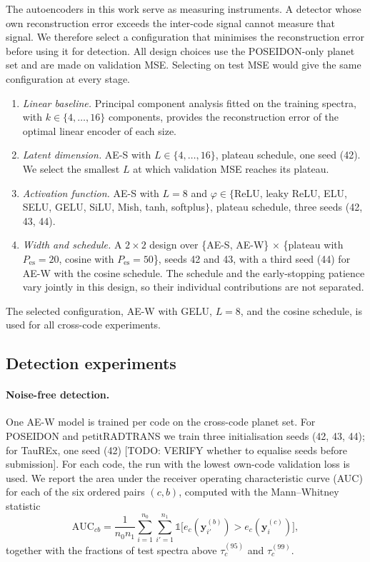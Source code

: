 The autoencoders in this work serve as measuring instruments.
A detector whose own reconstruction error exceeds the inter-code signal cannot measure that signal.
We therefore select a configuration that minimises the reconstruction error before using it for detection.
All design choices use the POSEIDON-only planet set and are made on validation MSE.
Selecting on test MSE would give the same configuration at every stage.
\begin{enumerate}
  \item \emph{Linear baseline.} Principal component analysis fitted on the training spectra, with $k\in\{4,\dots,16\}$ components, provides the reconstruction error of the optimal linear encoder of each size.
  \item \emph{Latent dimension.} AE-S with $L\in\{4,\dots,16\}$, plateau schedule, one seed (42). We select the smallest $L$ at which validation MSE reaches its plateau.
  \item \emph{Activation function.} AE-S with $L=8$ and $\varphi\in\{$ReLU, leaky ReLU, ELU, SELU, GELU, SiLU, Mish, tanh, softplus$\}$, plateau schedule, three seeds (42, 43, 44).
  \item \emph{Width and schedule.} A $2\times2$ design over \{AE-S, AE-W\} $\times$ \{plateau with $P_{\mathrm{es}}=20$, cosine with $P_{\mathrm{es}}=50$\}, seeds 42 and 43, with a third seed (44) for AE-W with the cosine schedule. The schedule and the early-stopping patience vary jointly in this design, so their individual contributions are not separated.
\end{enumerate}
The selected configuration, AE-W with GELU, $L=8$, and the cosine schedule, is used for all cross-code experiments.

\subsection{Detection experiments}
\label{sec:detsetup}

\paragraph{Noise-free detection.}
One AE-W model is trained per code on the cross-code planet set.
For POSEIDON and petitRADTRANS we train three initialisation seeds (42, 43, 44); for TauREx, one seed (42) [TODO: VERIFY whether to equalise seeds before submission].
For each code, the run with the lowest own-code validation loss is used.
We report the area under the receiver operating characteristic curve (AUC) for each of the six ordered pairs $(c,b)$, computed with the Mann--Whitney statistic
\begin{equation}
  \mathrm{AUC}_{cb} = \frac{1}{n_0 n_1}\sum_{i=1}^{n_0}\sum_{i'=1}^{n_1}\mathbb{1}\bigl[e_c(\mathbf{y}^{(b)}_{i'}) > e_c(\mathbf{y}^{(c)}_{i})\bigr],
  \label{eq:auc}
\end{equation}
together with the fractions of test spectra above $\tau_c^{(95)}$ and $\tau_c^{(99)}$.

